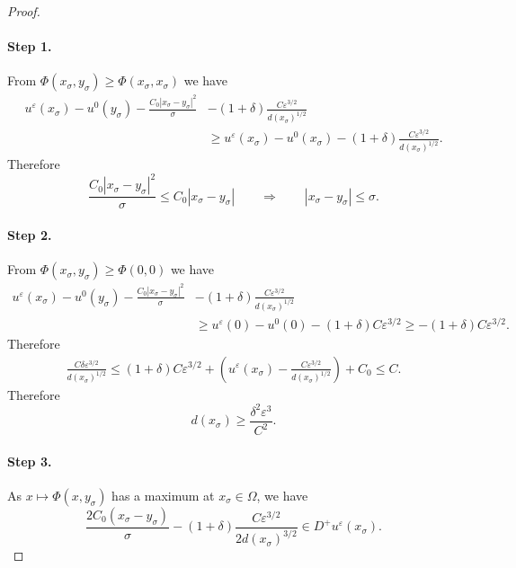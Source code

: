 \documentclass[11pt,reqno]{amsart}
\numberwithin{figure}{section}
\theoremstyle{plain}
\theoremstyle{remark}
\numberwithin{equation}{section}
\newcommand{\sig}{\sigma}
\begin{document}
\begin{proof}
\paragraph{Step 1.} From $\Phi(x_\sigma,y_\sigma) \geq \Phi(x_\sigma,x_\sigma)$ we have
\begin{align*}
     u^\varepsilon(x_\sigma) - u^0(y_\sigma) - \frac{C_0|x_\sigma-y_\sigma|^2}{\sigma} 
     &- \left(1+\delta\right)\frac{C\varepsilon^{3/2}}{d(x_\sigma)^{1/2}} \\
    &\geq  u^\varepsilon(x_\sigma) - u^0(x_\sigma) - \left(1+\delta\right)\frac{C\varepsilon^{3/2}}{d(x_\sigma)^{1/2}}.
\end{align*}
Therefore
\begin{equation*}
    \frac{C_0|x_\sigma - y_\sigma|^2}{\sigma} \leq C_0|x_\sig - y_\sigma| \qquad\Longrightarrow\qquad |x_\sigma - y_\sigma|\leq \sigma.
\end{equation*}
\paragraph{Step 2.} From $\Phi(x_\sigma,y_\sigma) \geq \Phi(0,0)$ we have
\begin{align*}
     u^\varepsilon(x_\sigma) - u^0(y_\sigma) - \frac{C_0|x_\sigma-y_\sigma|^2}{\sigma} 
     &- \left(1+\delta\right)\frac{C\varepsilon^{3/2}}{d(x_\sigma)^{1/2}} \\
    &\geq  u^\varepsilon(0) - u^0(0) - \left(1+\delta\right)C\varepsilon^{3/2} \geq  - \left(1+\delta\right)C\varepsilon^{3/2}.
\end{align*}
Therefore
\begin{align*}
    \frac{C\delta\varepsilon^{3/2}}{d(x_\sigma)^{1/2}} \leq  \left(1+\delta\right)C\varepsilon^{3/2} + \left(u^\varepsilon(x_\sigma) - \frac{C\varepsilon^{3/2}}{d(x_\sigma)^{1/2}}\right) + C_0 \leq C.
\end{align*}
Therefore 
\begin{equation*}
    d(x_\sigma)\geq \frac{\delta^2\varepsilon^3}{C^2}.
\end{equation*}
\paragraph{Step 3.} As $x\mapsto \Phi(x,y_\sigma)$ has a maximum at $x_\sigma \in \Omega$, we have
\begin{equation*}
    \frac{2C_0(x_\sigma - y_\sigma)}{\sigma} - \left(1+\delta\right)\frac{C\varepsilon^{3/2}}{2d(x_\sigma)^{3/2}} \in D^+u^\varepsilon(x_\sigma).
\end{equation*}
\end{proof} 



{}
%

\end{document}
